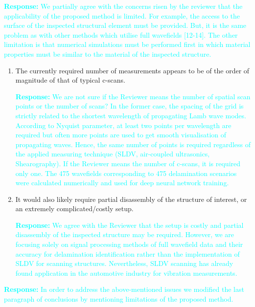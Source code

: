 \documentclass[11pt,a2paper]{report}
\begin{document}
	\textcolor{Cyan}{
		\textbf{Response:}
		We partially agree with the concerns risen by the reviewer that the applicability of the proposed method is limited.
	    For example, the access to the surface of the inspected structural element must be provided.
        But, it is the same problem as with other methods which utilise full wavefields [12-14].
        The other limitation is that numerical simulations must be performed first in which material properties must be similar to the material of the inspected structure.}
	
	\begin{enumerate}
		\item The currently required number of measurements appears to be of the order of magnitude of that of typical c-scans.
		
		\textcolor{Cyan}{
			\textbf{Response:}
			We are not sure if the Reviewer means the number of spatial scan points or the number of scans?
			In the former case, the spacing of the grid is strictly related to the shortest wavelength of propagating Lamb wave modes. According to Nyquist parameter, at least two points per wavelength are required but often more points are used to get smooth visualisation of propagating waves. Hence, the same number of points is required regardless of the applied measuring technique (SLDV, air-coupled ultrasonics, Shearography).
			If the Reviewer means the number of c-scans, it is required only one. The 475 wavefields corresponding to 475 delamination scenarios were calculated numerically and used for deep neural network training.
		}
		\item It would also likely require partial disassembly of the structure of interest, or an extremely complicated/costly setup. 
		
		\textcolor{Cyan}{
			\textbf{Response:}
			We agree with the Reviewer that the setup is costly and partial disassembly of the inspected structure may be required.
			However, we are focusing solely on signal processing methods of full wavefield data and their accuracy for delamination identification rather than the implementation of SLDV for scanning structures.
			Nevertheless, SLDV scanning has already found application in the automotive industry for vibration measurements.
		}
	\end{enumerate}

    \textcolor{Cyan}{
    	\textbf{Response:}
    	In order to address the above-mentioned issues we modified the last paragraph of conclusions by mentioning limitations of the proposed method.  
    }
\end{document}
